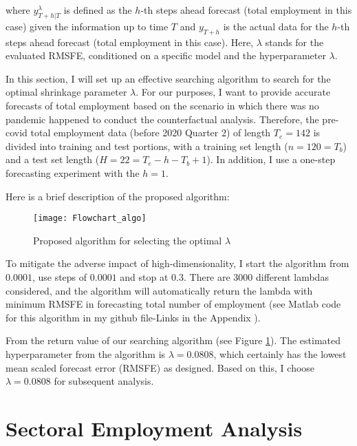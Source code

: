 \documentclass{monashthesis}
\begin{document}
where \({y}_{T+h|T}^{\lambda}\) is defined as the \(h\)-th steps ahead forecast (total employment in this case) given the information up to time \(T\) and \(y_{T+h}\) is the actual data for the \(h\)-th steps ahead forecast (total employment in this case). Here, \(\lambda\) stands for the evaluated RMSFE, conditioned on a specific model and the hyperparameter \(\lambda\).

In this section, I will set up an effective searching algorithm to search for the optimal shrinkage parameter \(\lambda\). For our purposes, I want to provide accurate forecasts of total employment based on the scenario in which there was no pandemic happened to conduct the counterfactual analysis. Therefore, the pre-covid total employment data (before 2020 Quarter 2) of length \(T_e=142\) is divided into training and test portions, with a training set length (\(n=120=T_b\)) and a test set length (\(H=22=T_e-h-T_b+1\)). In addition, I use a one-step forecasting experiment with the \(h=1\).

Here is a brief description of the proposed algorithm:

\graphicspath{ {/Users/elvisyang/Desktop/hon_proj/Disaggregated_Employment/Honours_thesis/figures} }

\begin{figure}[ht]
\texttt{[image: Flowchart\_algo]}
\centering
\caption{Proposed algorithm for selecting the optimal $\lambda$}
\label{fig:sealgo}
\end{figure}

To mitigate the adverse impact of high-dimensionality, I start the algorithm from \(0.0001\), use steps of \(0.0001\) and stop at \(0.3\). There are 3000 different lambdas considered, and the algorithm will automatically return the lambda with minimum RMSFE in forecasting total number of employment (see Matlab code for this algorithm in my github file-Links in the Appendix ).

From the return value of our searching algorithm (see Figure \ref{fig:sealgo}). The estimated hyperparameter from the algorithm is \(\lambda=0.0808\), which certainly has the lowest mean scaled forecast error (RMSFE) as designed. Based on this, I choose \(\lambda=0.0808\) for subsequent analysis.

\newpage

\hypertarget{sectoral-employment-analysis}{%
\chapter{Sectoral Employment Analysis}\label{sectoral-employment-analysis}}
\end{document}
